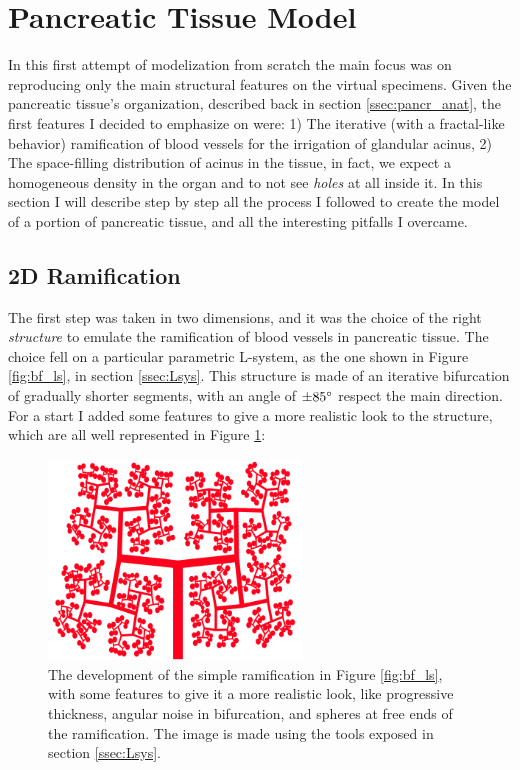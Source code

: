 \section{Pancreatic Tissue Model} \label{ssec:panc_tis_mod}
 In this first attempt of modelization from scratch the main focus was on reproducing only the main structural features on the virtual specimens. Given the pancreatic tissue's organization, described back in section \ref{ssec:pancr_anat}, the first features I decided to emphasize on were: 1) The iterative (with a fractal-like behavior) ramification of blood vessels for the irrigation of glandular acinus, 2) The space-filling distribution of acinus in the tissue, in fact, we expect a homogeneous density in the organ and to not see \textit{holes} at all inside it. In this section I will describe step by step all the process I followed to create the model of a portion of pancreatic tissue, and all the interesting pitfalls I overcame.

\subsection{2D Ramification}
    The first step was taken in two dimensions, and it was the choice of the right \textit{structure} to emulate the ramification of blood vessels in pancreatic tissue. The choice fell on a particular parametric L-system, as the one shown in Figure \ref{fig:bf_ls}, in section \ref{ssec:Lsys}. This structure is made of an iterative bifurcation of gradually shorter segments, with an angle of $\pm 85 \degree$ respect the main direction. For a start I added some features to give a more realistic look to the structure, which are all well represented in Figure \ref{fig:ram_feat}:

    \begin{figure}
        \centering
        \includegraphics[width = 0.6\textwidth]{images/ram_feat}
        \caption{The development of the simple ramification in Figure \ref{fig:bf_ls}, with some features to give it a more realistic look, like progressive thickness, angular noise in bifurcation, and spheres at free ends of the ramification. The image is made using the tools exposed in section \ref{ssec:Lsys}.}
        \label{fig:ram_feat}
    \end{figure}

